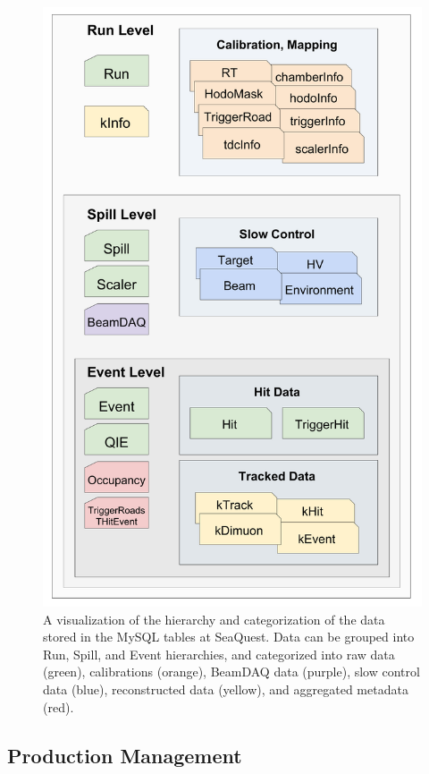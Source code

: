 \begin{figure}
	\centering
	\includegraphics[height=0.9\textheight]{figures/production/Schema-Layout.pdf}
	\caption{A visualization of the hierarchy and categorization of the data stored in the MySQL tables at SeaQuest. Data can be grouped into Run, Spill, and Event hierarchies, and categorized into raw data (green), calibrations (orange), BeamDAQ data (purple), slow control data (blue), reconstructed data (yellow), and aggregated metadata (red).}
	\label{fig:schema-layout}
\end{figure}

\subsection{Production Management}

